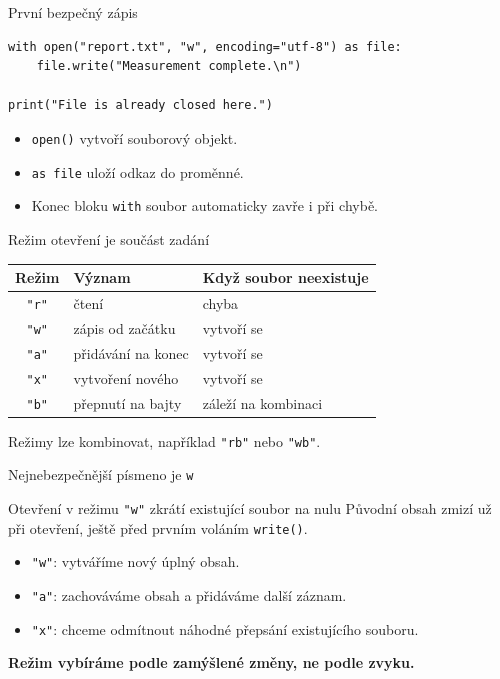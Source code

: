 \documentclass[aspectratio=169]{beamer}
\newcommand{\term}[1]{\textcolor{CodeBlue}{\textbf{#1}}}
\begin{document}
\begin{frame}[fragile]{První bezpečný zápis}
\begin{lstlisting}[style=python]
with open("report.txt", "w", encoding="utf-8") as file:
    file.write("Measurement complete.\n")

print("File is already closed here.")
\end{lstlisting}
  \begin{itemize}
    \item \texttt{open()} vytvoří souborový objekt.
    \item \texttt{as file} uloží odkaz do proměnné.
    \item Konec bloku \texttt{with} soubor automaticky zavře i při chybě.
  \end{itemize}
\end{frame}

\begin{frame}{Režim otevření je součást zadání}
  \centering
  \begin{tabular}{c l l}
    \textbf{Režim} & \textbf{Význam} & \textbf{Když soubor neexistuje} \\
    \hline
    \texttt{"r"} & čtení & chyba \\
    \texttt{"w"} & zápis od začátku & vytvoří se \\
    \texttt{"a"} & přidávání na konec & vytvoří se \\
    \texttt{"x"} & vytvoření nového & vytvoří se \\
    \texttt{"b"} & přepnutí na bajty & záleží na kombinaci \\
  \end{tabular}
  \vspace{5mm}

  Režimy lze kombinovat, například \texttt{"rb"} nebo \texttt{"wb"}.
\end{frame}

\begin{frame}{Nejnebezpečnější písmeno je \textcolor{WarningRed}{\texttt{w}}}
  \begin{alertblock}{Otevření v režimu \texttt{"w"} zkrátí existující soubor na nulu}
    Původní obsah zmizí už při otevření, ještě před prvním voláním \texttt{write()}.
  \end{alertblock}
  \begin{itemize}
    \item \texttt{"w"}: vytváříme nový úplný obsah.
    \item \texttt{"a"}: zachováváme obsah a přidáváme další záznam.
    \item \texttt{"x"}: chceme odmítnout náhodné přepsání existujícího souboru.
  \end{itemize}
  \vspace{2mm}
  \centering
  \term{Režim vybíráme podle zamýšlené změny, ne podle zvyku.}
\end{frame}
\end{document}
